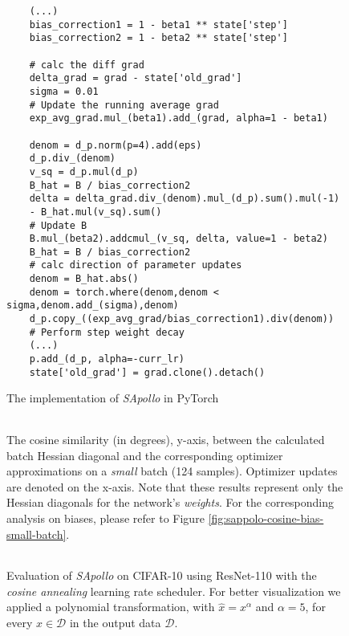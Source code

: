     \begin{figure}[H]
     \begin{verbatim}
    (...)
    bias_correction1 = 1 - beta1 ** state['step']
    bias_correction2 = 1 - beta2 ** state['step']

    # calc the diff grad
    delta_grad = grad - state['old_grad']
    sigma = 0.01
    # Update the running average grad
    exp_avg_grad.mul_(beta1).add_(grad, alpha=1 - beta1)

    denom = d_p.norm(p=4).add(eps)
    d_p.div_(denom)
    v_sq = d_p.mul(d_p)
    B_hat = B / bias_correction2
    delta = delta_grad.div_(denom).mul_(d_p).sum().mul(-1) 
    - B_hat.mul(v_sq).sum()
    # Update B
    B.mul_(beta2).addcmul_(v_sq, delta, value=1 - beta2)
    B_hat = B / bias_correction2
    # calc direction of parameter updates
    denom = B_hat.abs()
    denom = torch.where(denom,denom < sigma,denom.add_(sigma),denom)
    d_p.copy_((exp_avg_grad/bias_correction1).div(denom))
    # Perform step weight decay
    (...)
    p.add_(d_p, alpha=-curr_lr)
    state['old_grad'] = grad.clone().detach()
    \end{verbatim}
        \caption{The implementation of \emph{SApollo} in PyTorch}
        \label{fig:sapollo_imp}
    
        \end{figure}
    

        \begin{figure}[h!]
            \centering
            \begin{tabular}{cc}
                 \\ %
            \end{tabular}
            \caption{The cosine similarity (in degrees), y-axis, between the calculated batch Hessian diagonal and the corresponding optimizer approximations on a \emph{small} batch (124 samples).
            Optimizer updates are denoted on the x-axis.
            Note that these results represent only the Hessian diagonals for the network's \emph{weights}. For the corresponding analysis on biases, please refer to Figure \ref{fig:sappolo-cosine-bias-small-batch}.
        }
            \label{fig:sapollo-approx-weights}
        \end{figure}

        \begin{figure}[h!]
            \centering
            \begin{tabular}{cc}
                 \\ %
            \end{tabular}
            \caption{
               Evaluation of \emph{SApollo} on CIFAR-10 using ResNet-110 with the \emph{cosine annealing} learning rate scheduler. For better visualization we applied a polynomial transformation, with $\hat{x}=x^\alpha$ and $\alpha=5$, for every $x \in \mathcal{D}$ in the output data $ \mathcal{D}$. 
        }
        \end{figure}